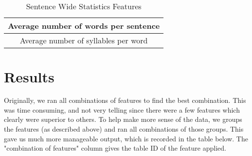 \documentclass[]{article}
\begin{document}
\begin{table}[!htbp]
	\begin{center}
		\begin{tabular}{| c |} \hline
			Average number of words per sentence \\ \hline
      Average number of syllables per word \\ \hline
		\end{tabular}
	\end{center}
	\caption{Sentence Wide Statistics Features}
	\label{table:group6}
\end{table}


\section{Results}

Originally, we ran all combinations of features to find the best combination.
This was time consuming, and not very telling since there were a few features which clearly were superior to others.
To help make more sense of the data, we groups the features (as described above) and ran all combinations of those groups.
This gave us much more manageable output, which is recorded in the table below.
The "combination of features" column gives the table ID of the feature applied.
\end{document}
